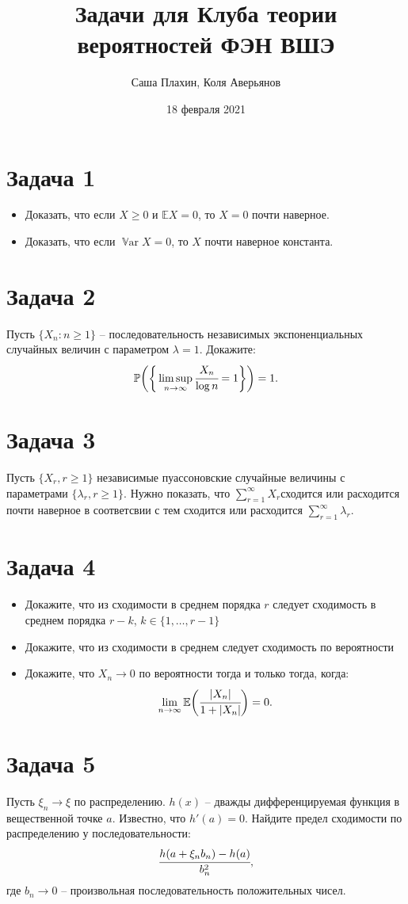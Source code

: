 \documentclass[a4paper, 12pt]{article}
\title{Задачи для Клуба теории вероятностей ФЭН ВШЭ}
\author{Саша Плахин, Коля Аверьянов}
\date{18 февраля 2021}
\newcommand{\E}{\mathbb{E}}
\renewcommand{\P}{\mathbb{P}}
\DeclareMathOperator{\Var}{\mathbb{V}ar}
\begin{document}
\maketitle


\section*{Задача 1}
\begin{itemize}
    \item Доказать, что если $X \geq 0$ и $\E X = 0$, то $X = 0$ почти наверное.
    \item Доказать, что если $\Var X = 0$, то $X$ почти наверное константа.
\end{itemize}


\section*{Задача 2}
Пусть $\{X_n: n \geq 1\}$ -- последовательность независимых экспоненциальных случайных величин с параметром $\lambda = 1$. Докажите:
$$
\P\bigg(\bigg\{\limsup_{n \to \infty} \cfrac{X_n}{\log n} = 1  \bigg\}\bigg) = 1.
$$

\section*{Задача 3}

Пусть $\{X_r, r \geq 1\}$
независимые пуассоновские случайные величины с параметрами $\{\lambda_r, r \geq 1\}$. Нужно показать, что $\sum_{r=1}^{\infty}X_r$сходится или расходится почти наверное в соответсвии с тем сходится или расходится
 $\sum_{r=1}^{\infty} \lambda_r$.

\section*{Задача 4}
\begin{itemize}
    \item Докажите, что из сходимости в среднем порядка $r$ следует сходимость в среднем порядка $r - k$, $k \in \{1, \ldots, r-1\}$
    \item Докажите, что из сходимости в среднем следует сходимость по вероятности
    \item Докажите, что $X_n \to 0$ по вероятности тогда и только тогда, когда:
    $$
    \lim_{n \to \infty} \E \bigg( \cfrac{|X_n|}{1+|X_n|}\bigg) = 0.
    $$
\end{itemize}


\section*{Задача 5}
Пусть $\xi_n \to \xi$ по распределению. $h(x)$ -- дважды дифференцируемая функция в вещественной точке $a$. Известно, что $h'(a) = 0$. Найдите предел сходимости по распределению у последовательности:
$$
\cfrac{h(a + \xi_n b_n) - h(a)}{b_n^2},
$$
где $b_n \to 0$ -- произвольная последовательность положительных чисел.
\end{document}
